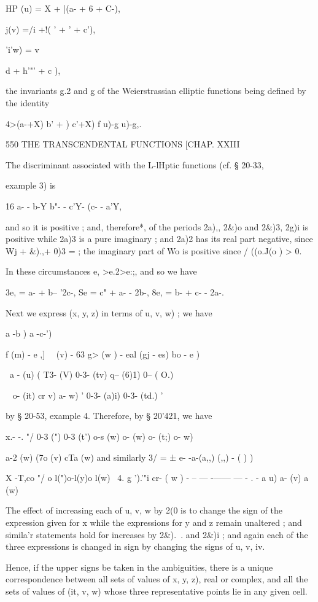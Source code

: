 {{HP (u) = X + |(a- + 6 + C-),

 j(v) =/i +!( ' + ' + c'),

'i'w) = v \ \ {d + h'"' + c ),

the invariants g.2 and g of the Weierstrassian elliptic functions
being defined by the identity

4>(a-+X) b' + ) c'+X) f u)-g u)-g,.



550 THE TRANSCENDENTAL FUNCTIONS [CHAP. XXIII

The discriminant associated with the L-lHptic functions (cf. § 20-33,

example 3) is

16 a- - b-Y b"- - c'Y- (c- - a'Y,

and so it is positive ; and, therefore*, of the periods 2a),, 2\&)o
and 2\&)3, 2g)i is positive while 2a)3 is a pure imaginary ; and 2a)2
has its real part negative, since Wj + \&).,+ 0)3 = ; the imaginary
part of Wo is positive since / ((o.J(o ) > 0.

In these circumstances e, >e.2>e:;, and so we have

3e, = a- + b-- '2c-, Se = c" + a- - 2b-, 8e, = b- + c- - 2a-.

Next we express (x, y, z) in terms of u, v, w) ; we have

 a -b ) a -c-')

   f (m) - e ,] \ \ (v) - 63 g> (w ) - eal (gj - es) bo - e )

\ a - (u) ( T3- (V) 0-3- (tv) q-- (6)1) 0-- ( O.)

~ o- (it) cr v) a- w) ' 0-3- (a)i) 0-3- (td.) '

by § 20-53, example 4. Therefore, by § 20'421, we have

x.- -. "/ 0-3 (") 0-3 (t') o-s (w) o- (w) o- (t;) o- w)

a-2 (w) (7o (v) cTa (w) and similarly 3/ = ± e- -a-(a,,) (,,) - ( ) )

X -T,co "/ o l(")o-l(y)o l(w) \ 4. g ').'"i cr- ( w ) - -- — -—— — - .
- a u) a- (v) a (w)

The effect of increasing each of u, v, w by 2(0 is to change the sign
of the expression given for x while the expressions for y and z remain
unaltered ; and simila'r statements hold for increases by 2\&).\ . and
2\&)i ; and again each of the three expressions is changed in sign by
changing the signs of u, v, iv.

Hence, if the upper signs be taken in the ambiguities, there is a
unique correspondence between all sets of values of x, y, z), real or
complex, and all the sets of values of (it, v, w) whose three
representative points lie in any given cell.

}}}
